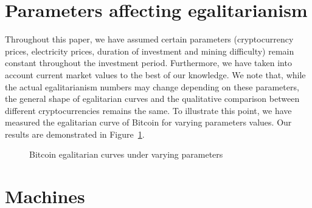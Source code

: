 \section{Parameters affecting egalitarianism}\label{sec:appendix-qualitative-difference}

Throughout this paper, we have assumed certain parameters (cryptocurrency
prices, electricity prices, duration of investment and mining difficulty) remain
constant throughout the investment period. Furthermore, we have taken into account
current market values to the best of our knowledge. We note that, while the
actual egalitarianism numbers may change depending on these parameters, the
general shape of egalitarian curves and the qualitative comparison between
different cryptocurrencies remains the same. To illustrate this point, we have
measured the egalitarian curve of Bitcoin for varying parameters values. Our
results are demonstrated in Figure~\ref{fig:different-settings}.

\begin{figure}
  \caption{Bitcoin egalitarian curves under varying parameters}
  \label{fig:different-settings}
\end{figure}

\section{Machines}\label{sec:appendix-data}

